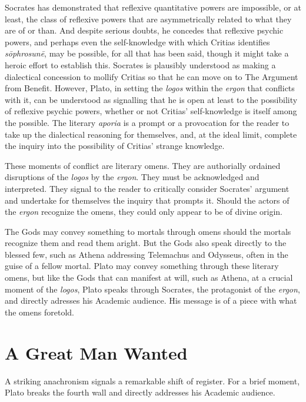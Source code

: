 Socrates has demonstrated that reflexive quantitative powers are impossible, or at least, the class of reflexive powers that are asymmetrically related to what they are of or than. And despite serious doubts, he concedes that reflexive psychic powers, and perhaps even the self-knowledge with which Critias identifies \emph{sōphrosunē}, may be possible, for all that has been said, though it might take a heroic effort to establish this. Socrates is plausibly understood as making a dialectical concession to mollify Critias so that he can move on to The Argument from Benefit. However, Plato, in setting the \emph{logos} within the \emph{ergon} that conflicts with it, can be understood as signalling that he is open at least to the possibility of reflexive psychic powers, whether or not Critias' self-knowledge is itself among the possible. The literary \emph{aporia} is a prompt or a provocation for the reader to take up the dialectical reasoning for themselves, and, at the ideal limit, complete the inquiry into the possibility of Critias' strange knowledge. 

These moments of conflict are literary omens. They are authorially ordained disruptions of the \emph{logos} by the \emph{ergon}. They must be acknowledged and interpreted. They signal to the reader to critically consider Socrates' argument and undertake for themselves the inquiry that prompts it. Should the actors of the \emph{ergon} recognize the omens, they could only appear to be of divine origin. 

The Gods may convey something to mortals through omens should the mortals recognize them and read them aright. But the Gods also speak directly to the blessed few, such as Athena addressing Telemachus and Odysseus, often in the guise of a fellow mortal. Plato may convey something through these literary omens, but like the Gods that can manifest at will, such as Athena, at a crucial moment of the \emph{logos}, Plato speaks through Socrates, the protagonist of the \emph{ergon}, and directly adresses his Academic audience. His message is of a piece with what the omens foretold.


\section{A Great Man Wanted} %
\label{sec:a_great_man_wanted}

A striking anachronism signals a remarkable shift of register. For a brief moment, Plato breaks the fourth wall and directly addresses his Academic audience.

